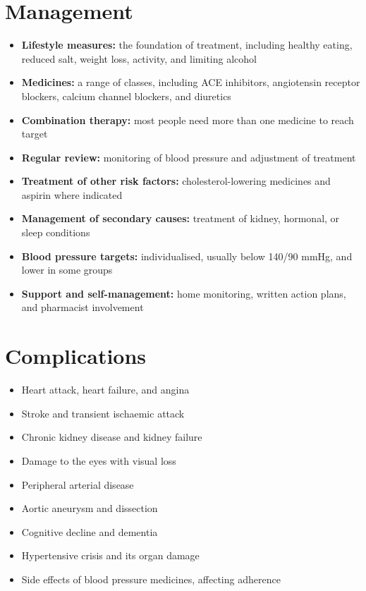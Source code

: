 \section*{Management}
\begin{itemize}
    \item \textbf{Lifestyle measures:} the foundation of treatment, including healthy eating, reduced salt, weight loss, activity, and limiting alcohol
    \item \textbf{Medicines:} a range of classes, including ACE inhibitors, angiotensin receptor blockers, calcium channel blockers, and diuretics
    \item \textbf{Combination therapy:} most people need more than one medicine to reach target
    \item \textbf{Regular review:} monitoring of blood pressure and adjustment of treatment
    \item \textbf{Treatment of other risk factors:} cholesterol-lowering medicines and aspirin where indicated
    \item \textbf{Management of secondary causes:} treatment of kidney, hormonal, or sleep conditions
    \item \textbf{Blood pressure targets:} individualised, usually below 140/90 mmHg, and lower in some groups
    \item \textbf{Support and self-management:} home monitoring, written action plans, and pharmacist involvement
\end{itemize}

\section*{Complications}
\begin{itemize}
    \item Heart attack, heart failure, and angina
    \item Stroke and transient ischaemic attack
    \item Chronic kidney disease and kidney failure
    \item Damage to the eyes with visual loss
    \item Peripheral arterial disease
    \item Aortic aneurysm and dissection
    \item Cognitive decline and dementia
    \item Hypertensive crisis and its organ damage
    \item Side effects of blood pressure medicines, affecting adherence
\end{itemize}

